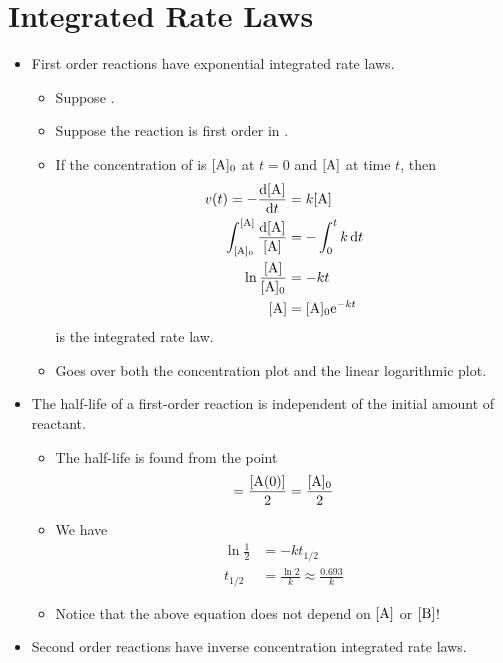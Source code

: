 \documentclass[../notes.tex]{subfiles}
\begin{document}
\section{Integrated Rate Laws}
\begin{itemize}
    \item {}First order reactions have exponential integrated rate laws.
    \begin{itemize}
        \item Suppose .
        \item Suppose the reaction is first order in .
        \item If the concentration of  is $[\ce{A}]_0$ at $t=0$ and $[\ce{A}]$ at time $t$, then
        \begin{align*}
            v(t) = -\dv{[\ce{A}]}{t} &= k[\ce{A}]\\
            \int_{[\ce{A}]_0}^{[\ce{A}]}\frac{\dd{[\ce{A}]}}{[\ce{A}]} &= -\int_0^tk\dd{t}\\
            \ln\frac{[\ce{A}]}{[\ce{A}]_0} &= -kt\\
            [\ce{A}] &= [\ce{A}]_0\e[-kt]
        \end{align*}
        is the integrated rate law.
        \item Goes over both the concentration plot and the linear logarithmic plot.
    \end{itemize}
    \item The half-life of a first-order reaction is independent of the initial amount of reactant.
    \begin{itemize}
        \item The half-life is found from the point
        \begin{equation*}
            [\ce{A}(t_{1/2})] = \frac{[\ce{A}(0)]}{2}
            = \frac{[\ce{A}]_0}{2}
        \end{equation*}
        \item We have
        \begin{align*}
            \ln\frac{1}{2} &= -kt_{1/2}\\
            t_{1/2} &= \frac{\ln 2}{k} \approx \frac{0.693}{k}
        \end{align*}
        \item Notice that the above equation does not depend on $[\ce{A}]$ or $[\ce{B}]$!
    \end{itemize}
    \item Second order reactions have inverse concentration integrated rate laws.

\end{itemize}
\end{document}
